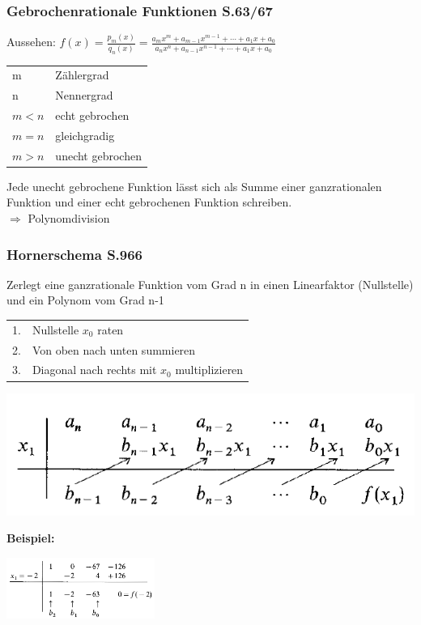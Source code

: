 		\subsubsection{Gebrochenrationale Funktionen S.63/67}
			Aussehen: $f(x)=\frac{p_m(x)}{q_n(x)}=\frac{a_mx^{m}+a_{m-1}x^{m-1}+\cdots+a_1x+a_0}{a_nx^{n}+a_{n-1}x^{n-1}+\cdots+a_1x+a_0}$ \\
			
			\begin{tabular}{ll} 
				m & Zählergrad \\
				n & Nennergrad \\
				$m < n$ & echt gebrochen \\
				$m = n$ & gleichgradig \\
				$m > n$ & unecht gebrochen \\ 
			\end{tabular}	
		
			Jede unecht gebrochene Funktion lässt sich als Summe einer ganzrationalen Funktion und einer echt gebrochenen Funktion schreiben. \\
			$\Rightarrow$ Polynomdivision \\

		\subsubsection{Hornerschema S.966}
			Zerlegt eine ganzrationale Funktion vom Grad n in einen Linearfaktor (Nullstelle) und ein Polynom vom Grad n-1 \\
			
			\begin{tabular}{ll}
				1. & Nullstelle $x_0$ raten \\
				2. & Von oben nach unten summieren \\
				3. & Diagonal nach rechts mit $x_0$ multiplizieren \\
			\end{tabular}	
			
			\includegraphics[width=0.7\linewidth]{Bilder/hornerschema_allg}
					
			\textbf{Beispiel:}
			
			\includegraphics[height=2cm]{Bilder/hornerschema_bsp}

